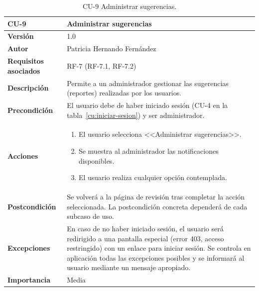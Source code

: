\begin{table}[p]
	\centering
	\begin{tabularx}{\linewidth}{ p{} p{} }
		\toprule
		\textbf{CU-9}    & \textbf{Administrar sugerencias}\\
		\toprule
		\textbf{Versión}              & 1.0    \\
		\textbf{Autor}                & Patricia Hernando Fernández \\
		\textbf{Requisitos asociados} & RF-7 (RF-7.1, RF-7.2) \\
		\textbf{Descripción}          & Permite a un administrador gestionar las sugerencias (reportes) realizadas por los usuarios.\\
		\textbf{Precondición}         & El usuario debe de haber iniciado sesión (CU-4 en la tabla~\ref{cu:iniciar-sesion}) y ser administrador. \\
		\textbf{Acciones}             &
		\begin{enumerate}
			\def\labelenumi{\arabic{enumi}.}
			\tightlist
			\item El usuario selecciona <<Administrar sugerencias>>.
			\item Se muestra al administrador las notificaciones disponibles.
			\item El usuario realiza cualquier opción contemplada.
		\end{enumerate}\\
		\textbf{Postcondición}        & Se volverá a la página de revisión tras completar la acción seleccionada. La postcondición concreta dependerá de cada subcaso de uso. \\
		\textbf{Excepciones}          & En caso de no haber iniciado sesión, el usuario será redirigido a una pantalla especial (error 403, acceso restringido) con un enlace para iniciar sesión. Se controla en aplicación todas las excepciones posibles y se informará al usuario mediante un mensaje apropiado. \\
		\textbf{Importancia}          & Media \\
		\bottomrule
	\end{tabularx}
	\caption{CU-9 Administrar sugerencias.}
	\label{cu:admin-sugerencias}
\end{table}

